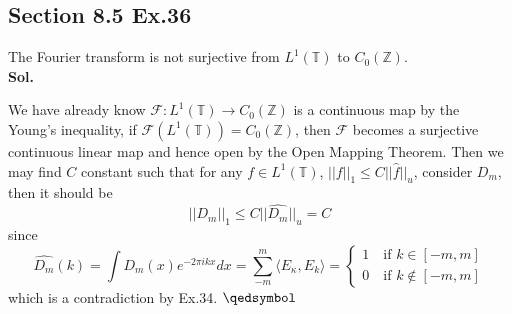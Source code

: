 \documentclass[lang=en,11pt,a4paper,citestyle =authoryear]{elegantpaper}
\newcommand{\prvd}{$\hfill \qedsymbol$}
\newcommand{\Z}{\mathbb{Z}}
\begin{document}
\subsection*{Section 8.5 Ex.36}
The Fourier transform is not surjective from $L^1(\mathbb{T})$ to $C_0(\Z)$.
\vspace{0.5em}\\
\textbf{Sol.} \par
    We have already know $\mathcal{F}:L^1(\mathbb{T}) \to C_0(\Z)$ is a continuous map by the Young's inequality, if $\mathcal{F}(L^1(\mathbb{T})) = C_0(\Z)$, then $\mathcal{F}$ becomes a surjective continuous linear map and hence open by the Open Mapping Theorem. Then we may find $C$ constant such that for any $f\in L^1(\mathbb{T})$, $||f||_1 \leq C||\hat{f}||_u$, consider $D_m$, then it should be
    \[
    ||D_m||_1 \leq C||\hat{D_m}||_u = C
    \]
    since
    \[
    \hat{D_m}(k) = \int D_m(x) e^{-2\pi i kx}dx = \sum_{-m}^m \langle E_{\kappa},E_k\rangle = \begin{cases}
    1\quad\text{if }k\in[-m,m] \\
    0\quad\text{if }k\notin[-m,m] 
    \end{cases}
    \]
    which is a contradiction by Ex.34.
\prvd
\vspace{0.5em}
\end{document}
